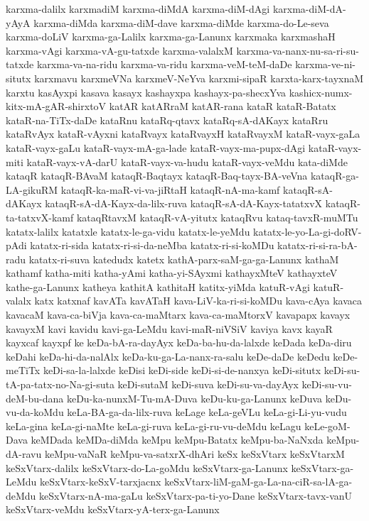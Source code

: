 {karxma-dalilx
karxmadiM
karxma-diMdA
karxma-diM-dAgi
karxma-diM-dA-yAyA
karxma-diMda
karxma-diM-dave
karxma-diMde
karxma-do-Le-seva
karxma-doLiV
karxma-ga-Lalilx
karxma-ga-Lanunx
karxmaka
karxmashaH
karxma-vAgi
karxma-vA-gu-tatxde
karxma-valalxM
karxma-va-nanx-nu-sa-ri-su-tatxde
karxma-va-na-ridu
karxma-va-ridu
karxma-veM-teM-daDe
karxma-ve-ni-situtx
karxmavu
karxmeVNa
karxmeV-NeYva
karxmi-sipaR
karxta-karx-tayxnaM
karxtu
kasAyxpi
kasava
kasayx
kashayxpa
kashayx-pa-shecxYva
kashicx-numx-kitx-mA-gAR-shirxtoV
katAR
katARraM
katAR-rana
kataR
kataR-Batatx
kataR-na-TiTx-daDe
kataRnu
kataRq-qtavx
kataRq-sA-dAKayx
kataRru
kataRvAyx
kataR-vAyxni
kataRvayx
kataRvayxH
kataRvayxM
kataR-vayx-gaLa
kataR-vayx-gaLu
kataR-vayx-mA-ga-lade
kataR-vayx-ma-pupx-dAgi
kataR-vayx-miti
kataR-vayx-vA-darU
kataR-vayx-va-hudu
kataR-vayx-veMdu
kata-diMde
kataqR
kataqR-BAvaM
kataqR-Baqtayx
kataqR-Baq-tayx-BA-veVna
kataqR-ga-LA-gikuRM
kataqR-ka-maR-vi-va-jiRtaH
kataqR-nA-ma-kamf
kataqR-sA-dAKayx
kataqR-sA-dA-Kayx-da-lilx-ruva
kataqR-sA-dA-Kayx-tatatxvX
kataqR-ta-tatxvX-kamf
kataqRtavxM
kataqR-vA-yitutx
kataqRvu
kataq-tavxR-muMTu
katatx-lalilx
katatxle
katatx-le-ga-vidu
katatx-le-yeMdu
katatx-le-yo-La-gi-doRV-pAdi
katatx-ri-sida
katatx-ri-si-da-neMba
katatx-ri-si-koMDu
katatx-ri-si-ra-bA-radu
katatx-ri-suva
katedudx
katetx
kathA-parx-saM-ga-ga-Lanunx
kathaM
kathamf
katha-miti
katha-yAmi
katha-yi-SAyxmi
kathayxMteV
kathayxteV
kathe-ga-Lanunx
katheya
kathitA
kathitaH
katitx-yiMda
katuR-vAgi
katuR-valalx
katx
katxnaf
kavATa
kavATaH
kava-LiV-ka-ri-si-koMDu
kava-cAya
kavaca
kavacaM
kava-ca-biVja
kava-ca-maMtarx
kava-ca-maMtorxV
kavapapx
kavayx
kavayxM
kavi
kavidu
kavi-ga-LeMdu
kavi-maR-niVSiV
kaviya
kavx
kayaR
kayxcaf
kayxpf
ke
keDa-bA-ra-dayAyx
keDa-ba-hu-da-lalxde
keDada
keDa-diru
keDahi
keDa-hi-da-nalAlx
keDa-ku-ga-La-nanx-ra-salu
keDe-daDe
keDedu
keDe-meTiTx
keDi-sa-la-lalxde
keDisi
keDi-side
keDi-si-de-nanxya
keDi-situtx
keDi-su-tA-pa-tatx-no-Na-gi-suta
keDi-sutaM
keDi-suva
keDi-su-va-dayAyx
keDi-su-vu-deM-bu-dana
keDu-ka-nunxM-Tu-mA-Duva
keDu-ku-ga-Lanunx
keDuva
keDu-vu-da-koMdu
keLa-BA-ga-da-lilx-ruva
keLage
keLa-geVLu
keLa-gi-Li-yu-vudu
keLa-gina
keLa-gi-naMte
keLa-gi-ruva
keLa-gi-ru-vu-deMdu
keLagu
keLe-goM-Dava
keMDada
keMDa-diMda
keMpu
keMpu-Batatx
keMpu-ba-NaNxda
keMpu-dA-ravu
keMpu-vaNaR
keMpu-va-satxrX-dhAri
keSx
keSxVtarx
keSxVtarxM
keSxVtarx-dalilx
keSxVtarx-do-La-goMdu
keSxVtarx-ga-Lanunx
keSxVtarx-ga-LeMdu
keSxVtarx-keSxV-tarxjacnx
keSxVtarx-liM-gaM-ga-La-na-ciR-sa-lA-ga-deMdu
keSxVtarx-nA-ma-gaLu
keSxVtarx-pa-ti-yo-Dane
keSxVtarx-tavx-vanU
keSxVtarx-veMdu
keSxVtarx-yA-terx-ga-Lanunx
}
